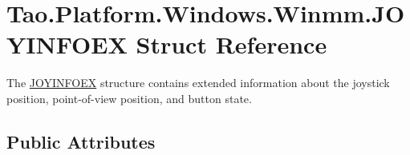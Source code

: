 \hypertarget{struct_tao_1_1_platform_1_1_windows_1_1_winmm_1_1_j_o_y_i_n_f_o_e_x}{
\section{Tao.Platform.Windows.Winmm.JOYINFOEX Struct Reference}
\label{struct_tao_1_1_platform_1_1_windows_1_1_winmm_1_1_j_o_y_i_n_f_o_e_x}
}


The \hyperlink{struct_tao_1_1_platform_1_1_windows_1_1_winmm_1_1_j_o_y_i_n_f_o_e_x}{JOYINFOEX} structure contains extended information about the joystick position, point-\/of-\/view position, and button state.  


\subsection*{Public Attributes}
